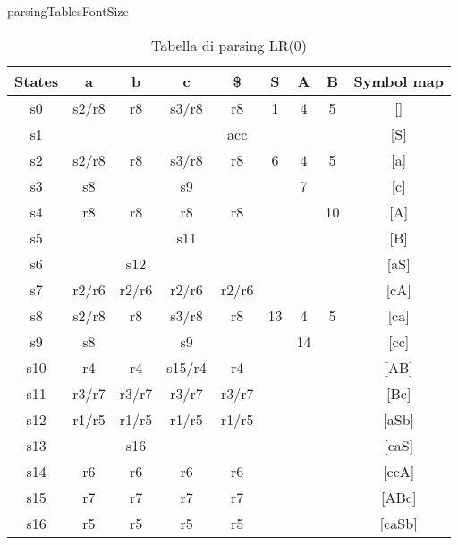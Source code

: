 {%
\begin{table}[H]\centering\ifcsname parsingTablesFontSize\endcsname \parsingTablesFontSize \fi
	\begin{tabular}{ccccccccc}
		\toprule
		States & a     & b     & c      & \$    & S  & A  & B  & Symbol map \\
		\midrule
		s0     & s2/r8 & r8    & s3/r8  & r8    & 1  & 4  & 5  & []         \\
		s1     &       &       &        & acc   &    &    &    & [S]        \\
		s2     & s2/r8 & r8    & s3/r8  & r8    & 6  & 4  & 5  & [a]        \\
		s3     & s8    &       & s9     &       &    & 7  &    & [c]        \\
		s4     & r8    & r8    & r8     & r8    &    &    & 10 & [A]        \\
		s5     &       &       & s11    &       &    &    &    & [B]        \\
		s6     &       & s12   &        &       &    &    &    & [aS]       \\
		s7     & r2/r6 & r2/r6 & r2/r6  & r2/r6 &    &    &    & [cA]       \\
		s8     & s2/r8 & r8    & s3/r8  & r8    & 13 & 4  & 5  & [ca]       \\
		s9     & s8    &       & s9     &       &    & 14 &    & [cc]       \\
		s10    & r4    & r4    & s15/r4 & r4    &    &    &    & [AB]       \\
		s11    & r3/r7 & r3/r7 & r3/r7  & r3/r7 &    &    &    & [Bc]       \\
		s12    & r1/r5 & r1/r5 & r1/r5  & r1/r5 &    &    &    & [aSb]      \\
		s13    &       & s16   &        &       &    &    &    & [caS]      \\
		s14    & r6    & r6    & r6     & r6    &    &    &    & [ccA]      \\
		s15    & r7    & r7    & r7     & r7    &    &    &    & [ABc]      \\
		s16    & r5    & r5    & r5     & r5    &    &    &    & [caSb]     \\
		\bottomrule
	\end{tabular}
	\caption{Tabella di parsing LR(0)}\end{table}


}
